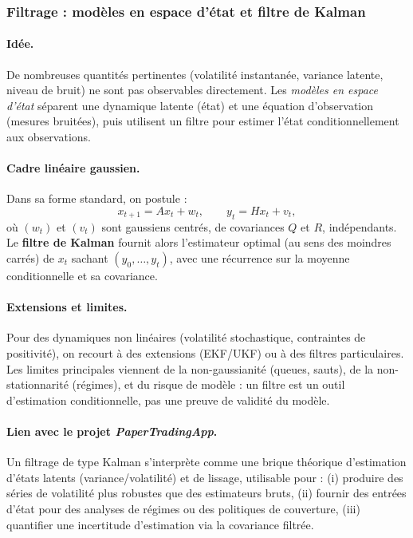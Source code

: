 \documentclass[11pt,a4paper]{article}
\newcommand{\1}{\mathbf{1}}
\begin{document}
\subsubsection{Filtrage : mod\`eles en espace d'\'etat et filtre de Kalman}

\paragraph{Id\'ee.}
De nombreuses quantit\'es pertinentes (volatilité instantan\'ee, variance latente, niveau de bruit) ne sont pas observables
directement. Les \emph{mod\`eles en espace d'\'etat} s\'eparent une dynamique latente (\'etat) et une \'equation d'observation
(mesures bruit\'ees), puis utilisent un filtre pour estimer l'\'etat conditionnellement aux observations.

\paragraph{Cadre lin\'eaire gaussien.}
Dans sa forme standard, on postule :
\[
x_{t+1} = A x_t + w_t,
\qquad
y_t = H x_t + v_t,
\]
o\`u $(w_t)$ et $(v_t)$ sont gaussiens centr\'es, de covariances $Q$ et $R$, ind\'ependants. Le \textbf{filtre de Kalman}
fournit alors l'estimateur optimal (au sens des moindres carr\'es) de $x_t$ sachant $(y_0,\dots,y_t)$, avec une r\'ecurrence
sur la moyenne conditionnelle et sa covariance.

\paragraph{Extensions et limites.}
Pour des dynamiques non lin\'eaires (volatilité stochastique, contraintes de positivité), on recourt \`a des extensions
(EKF/UKF) ou \`a des filtres particulaires. Les limites principales viennent de la non-gaussianit\'e (queues, sauts),
de la non-stationnarit\'e (r\'egimes), et du risque de mod\`ele : un filtre est un outil d'estimation conditionnelle,
pas une preuve de validit\'e du mod\`ele.

\paragraph{Lien avec le projet \emph{PaperTradingApp}.}
Un filtrage de type Kalman s'interpr\`ete comme une brique th\'eorique d'estimation d'\'etats latents (variance/volatilité)
et de lissage, utilisable pour : (i) produire des s\'eries de volatilité plus robustes que des estimateurs bruts,
(ii) fournir des entr\'ees d'\'etat pour des analyses de r\'egimes ou des politiques de couverture, (iii) quantifier
une incertitude d'estimation via la covariance filtr\'ee.
\end{document}
